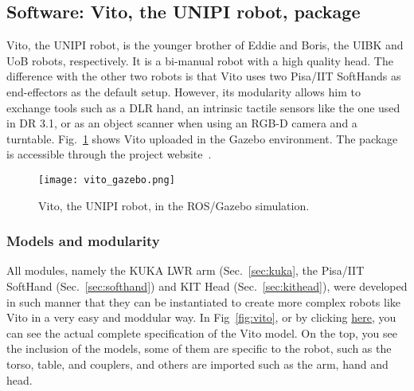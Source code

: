 \subsection{Software: Vito, the UNIPI robot, package}
\label{sec:vito}

Vito, the UNIPI robot, is the younger brother of Eddie and Boris, the UIBK and UoB robots, respectively. It is a bi-manual robot with a high quality head. The difference with the other two robots is that Vito uses two Pisa/IIT SoftHands as end-effectors as the default setup. However, its modularity allows him to exchange tools such as a DLR hand, an intrinsic tactile sensors like the one used in DR 3.1, or as an object scanner when using an RGB-D camera and a turntable. Fig.~\ref{fig:vito_gazebo} shows Vito uploaded in the Gazebo environment. The package is accessible through the project website~\cite{PACMAN_software}.

\begin{figure}[h]
\centering
\texttt{[image: vito\_gazebo.png]}
\caption{Vito, the UNIPI robot, in the ROS/Gazebo simulation.}
\label{fig:vito_gazebo}
\end{figure}

\subsubsection{Models and modularity}

All modules, namely the KUKA LWR arm (Sec.~\ref{sec:kuka}, the Pisa/IIT SoftHand (Sec.~\ref{sec:softhand}) and KIT Head (Sec.~\ref{sec:kithead}), were developed in such manner that they can be instantiated to create more complex robots like Vito in a very easy and moddular way. In Fig~\ref{fig:vito}, or by clicking \href{https://github.com/CentroEPiaggio/vito_robot/blob/master/vito_description/robot/vito.urdf.xacro}{here}, you can see the actual complete specification of the Vito model. On the top, you see the inclusion of the models, some of them are specific to the robot, such as the torso, table, and couplers, and others are imported such as the arm, hand and head.

